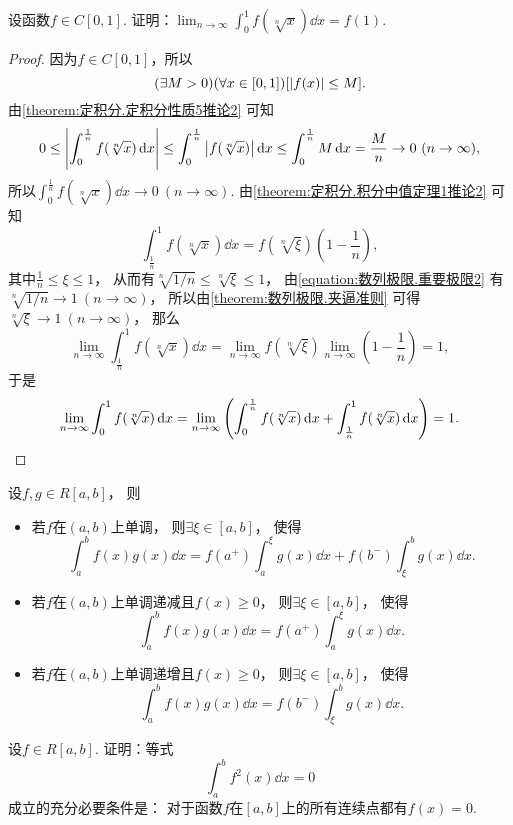 \begin{example}
设函数\(f \in C[0,1]\).
证明：\(\lim_{n\to\infty} \int_0^1 f(\sqrt[n]{x}) \dd{x} = f(1)\).
\begin{proof}
因为\(f \in C[0,1]\)，所以\[
	(\exists M>0)
	(\forall x\in[0,1])
	[\abs{f(x)} \leq M].
\]
由\cref{theorem:定积分.定积分性质5推论2}
可知\[
	0 \leq \abs{\int_0^{\frac1n} f(\sqrt[n]{x}) \dd{x}}
	\leq \int_0^{\frac1n} \abs{f(\sqrt[n]{x})} \dd{x}
	\leq \int_0^{\frac1n} M \dd{x}
	= \frac{M}{n}
	\to 0\ (n\to\infty),
\]
所以\(\int_0^{\frac1n} f(\sqrt[n]{x}) \dd{x} \to 0\ (n\to\infty)\).
由\cref{theorem:定积分.积分中值定理1推论2}
可知\[
	\int_{\frac1n}^1 f(\sqrt[n]{x}) \dd{x}
	= f(\sqrt[n]{\xi}) \left( 1-\frac1n \right),
\]
其中\(\frac1n \leq \xi \leq 1\)，
从而有\(\sqrt[n]{1/n} \leq \sqrt[n]{\xi} \leq 1\)，
由\cref{equation:数列极限.重要极限2} 有\(\sqrt[n]{1/n} \to 1\ (n\to\infty)\)，
所以由\cref{theorem:数列极限.夹逼准则}
可得\(\sqrt[n]{\xi} \to 1\ (n\to\infty)\)，
那么\[
	\lim_{n\to\infty} \int_{\frac1n}^1 f(\sqrt[n]{x}) \dd{x}
	= \lim_{n\to\infty} f(\sqrt[n]{\xi}) \lim_{n\to\infty} \left( 1-\frac1n \right)
	= 1,
\]
于是\[
	\lim_{n\to\infty} \int_0^1 f(\sqrt[n]{x}) \dd{x}
	= \lim_{n\to\infty} \left(
		\int_0^{\frac1n} f(\sqrt[n]{x}) \dd{x}
		+ \int_{\frac1n}^1 f(\sqrt[n]{x}) \dd{x}
	\right)
	= 1.
	\qedhere
\]
\end{proof}
\end{example}

\begin{theorem}[积分第二中值定理]\label{theorem:定积分.积分中值定理2}
设\(f,g \in R[a,b]\)，
则\begin{itemize}
	\item 若\(f\)在\((a,b)\)上单调，
	则\(\exists \xi \in [a,b]\)，
	使得\[
		\int_a^b f(x) g(x) \dd{x}
		= f(a^+) \int_a^{\xi} g(x) \dd{x} + f(b^-) \int_{\xi}^b g(x) \dd{x}.
	\]
	\item 若\(f\)在\((a,b)\)上单调递减且\(f(x) \geq 0\)，
	则\(\exists \xi \in [a,b]\)，
	使得\[
		\int_a^b f(x) g(x) \dd{x}
		= f(a^+) \int_a^{\xi} g(x) \dd{x}.
	\]
	\item 若\(f\)在\((a,b)\)上单调递增且\(f(x) \geq 0\)，
	则\(\exists \xi \in [a,b]\)，
	使得\[
		\int_a^b f(x) g(x) \dd{x}
		= f(b^-) \int_{\xi}^b g(x) \dd{x}.
	\]
\end{itemize}
\end{theorem}

\begin{example}
设\(f \in R[a,b]\).
证明：等式\[
	\int_a^b f^2(x) \dd{x} = 0
\]成立的充分必要条件是：
对于函数\(f\)在\([a,b]\)上的所有连续点都有\(f(x)=0\).
\end{example}

